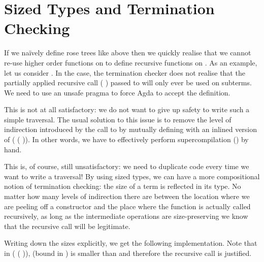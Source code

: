 
\section{Sized Types and Termination Checking}
\label{sec:sizetermination}

If we naïvely define rose trees like above then we quickly realise that we cannot
re-use higher order functions on  to define recursive functions on .
As an example, let us consider . In the  case,
the termination checker does not realise that the partially applied recursive call
( ) passed to 
will only ever be used on subterms. We need to use an unsafe  pragma
to force Agda to accept the definition.


This is not at all satisfactory: we do not want to give up safety to write such a
simple traversal. The usual solution to this issue is to remove the level of
indirection introduced by the call to  by mutually
defining with  an inlined version of
( ( )).
In other words, we have to effectively perform supercompilation
(\cite{mendelgleason2012}) by hand.


This is, of course, still unsatisfactory: we need to duplicate code every
time we want to write a traversal! By using sized types, we can have a more
compositional notion of termination checking: the size of a term is reflected
in its type. No matter how many levels of indirection there are between the
location where we are peeling off a constructor and the place where the function
is actually called recursively, as long as the intermediate operations are
size-preserving we know that the recursive call will be legitimate.

Writing down the sizes explicitly, we get the following implementation. Note
that in ( (  )),
 (bound in ) is smaller than  and therefore the recursive
call is justified.


